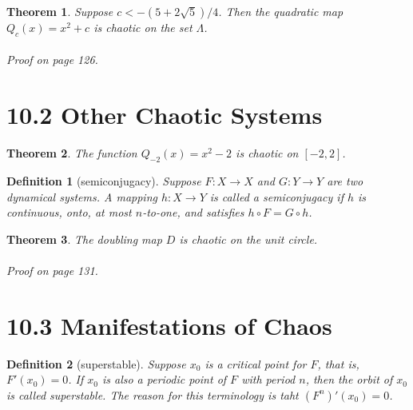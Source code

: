 \documentclass{article}
\newtheorem{definition}{Definition}
\newtheorem{theorem}{Theorem}
\begin{document}
\begin{theorem}
    Suppose $c < -(5+2\sqrt{5})/4$. Then the quadratic map $Q_c(x) =x^2+c$ is chaotic on the set $\Lambda$.\\\\
    Proof on page 126.
\end{theorem}

\section*{10.2 Other Chaotic Systems}

\begin{theorem}
    The function $Q_{-2}(x)=x^2-2$ is chaotic on $[-2,2]$.
\end{theorem}

\begin{definition}[semiconjugacy]
    Suppose $F:X\rightarrow X$ and $G:Y\rightarrow Y$ are two dynamical systems. A mapping $h:X\rightarrow Y$ is called a \textit{semiconjugacy} if $h$ is continuous, onto, at most $n$-to-one, and satisfies $h \circ F = G\circ h$.
\end{definition}

\begin{theorem}
    The doubling map $D$ is chaotic on the unit circle.\\\\
    Proof on page 131.
\end{theorem}

\section*{10.3 Manifestations of Chaos}

\begin{definition}[superstable]
    Suppose $x_0$ is a critical point for $F$, that is, $F'(x_0) = 0$. If $x_0$ is also a periodic point of $F$ with period $n$, then the orbit of $x_0$ is called \textit{superstable}. The reason for this terminology is taht $(F^n)'(x_0)=0$.
\end{definition}
\end{document}
